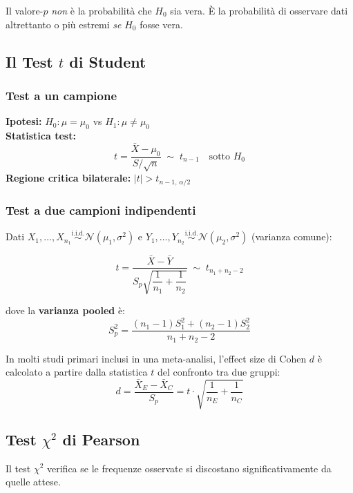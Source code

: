 \documentclass[12pt, a4paper]{article}
\newcommand{\N}{\mathcal{N}}
\newcommand{\iid}{\overset{\text{i.i.d.}}{\sim}}
\begin{document}
\begin{nota}
  Il valore-$p$ \emph{non} è la probabilità che $H_0$ sia vera.
  È la probabilità di osservare dati altrettanto o più estremi
  \emph{se} $H_0$ fosse vera.
\end{nota}

\subsection{Il Test $t$ di Student}

\subsubsection{Test a un campione}

\textbf{Ipotesi:} $H_0: \mu = \mu_0$ vs $H_1: \mu \neq \mu_0$ \\[4pt]
\textbf{Statistica test:}
\[
  t = \frac{\bar{X} - \mu_0}{S/\sqrt{n}} \;\sim\; t_{n-1}
  \quad \text{sotto } H_0
\]
\textbf{Regione critica bilaterale:}
$|t| > t_{n-1,\, \alpha/2}$

\subsubsection{Test a due campioni indipendenti}

Dati $X_1, \ldots, X_{n_1} \iid \N(\mu_1, \sigma^2)$ e
$Y_1, \ldots, Y_{n_2} \iid \N(\mu_2, \sigma^2)$ (varianza comune):

\[
  t = \frac{\bar{X} - \bar{Y}}{S_p\sqrt{\dfrac{1}{n_1} + \dfrac{1}{n_2}}}
  \;\sim\; t_{n_1+n_2-2}
\]

dove la \textbf{varianza pooled} è:
\[
  S_p^2 = \frac{(n_1-1)S_1^2 + (n_2-1)S_2^2}{n_1+n_2-2}
\]

\begin{esempio}
  In molti studi primari inclusi in una meta-analisi, l'effect size di Cohen $d$
  è calcolato a partire dalla statistica $t$ del confronto tra due gruppi:
  \[
    d = \frac{\bar{X}_E - \bar{X}_C}{S_p}
      = t \cdot \sqrt{\frac{1}{n_E} + \frac{1}{n_C}}
  \]
\end{esempio}

\subsection{Test $\chi^2$ di Pearson}

Il test $\chi^2$ verifica se le frequenze osservate si discostano
significativamente da quelle attese.
\end{document}
